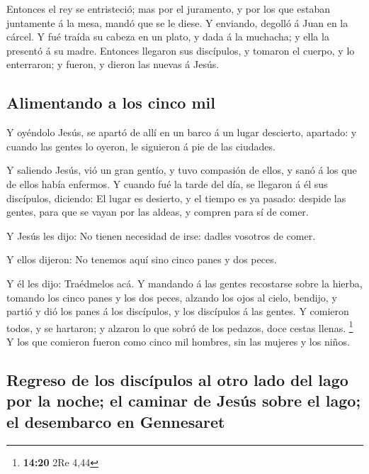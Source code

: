  Entonces el rey se entristeció; mas por el juramento, y
por los que estaban juntamente á la mesa, mandó que se le diese.
 Y enviando, degolló á Juan en la cárcel. 
Y fué traída su cabeza en un plato, y dada á la muchacha; y ella la
presentó á su madre.  Entonces llegaron sus discípulos, y
tomaron el cuerpo, y lo enterraron; y fueron, y dieron las nuevas á
Jesús.

\hypertarget{alimentando-a-los-cinco-mil}{%
\subsection{Alimentando a los cinco
mil}\label{alimentando-a-los-cinco-mil}}

 Y oyéndolo Jesús, se apartó de allí en un barco á un
lugar descierto, apartado: y cuando las gentes lo oyeron, le siguieron á
pie de las ciudades.

 Y saliendo Jesús, vió un gran gentío, y tuvo compasión
de ellos, y sanó á los que de ellos había enfermos.  Y
cuando fué la tarde del día, se llegaron á él sus discípulos, diciendo:
El lugar es desierto, y el tiempo es ya pasado: despide las gentes, para
que se vayan por las aldeas, y compren para sí de comer.

 Y Jesús les dijo: No tienen necesidad de irse: dadles
vosotros de comer.

 Y ellos dijeron: No tenemos aquí sino cinco panes y dos
peces.

 Y él les dijo: Traédmelos acá.  Y
mandando á las gentes recostarse sobre la hierba, tomando los cinco
panes y los dos peces, alzando los ojos al cielo, bendijo, y partió y
dió los panes á los discípulos, y los discípulos á las gentes.
 Y comieron todos, y se hartaron; y alzaron lo que sobró
de los pedazos, doce cestas llenas. \footnote{\textbf{14:20} 2Re 4,44}
 Y los que comieron fueron como cinco mil hombres, sin
las mujeres y los niños.

\hypertarget{regreso-de-los-discuxedpulos-al-otro-lado-del-lago-por-la-noche-el-caminar-de-jesuxfas-sobre-el-lago-el-desembarco-en-gennesaret}{%
\subsection{Regreso de los discípulos al otro lado del lago por la
noche; el caminar de Jesús sobre el lago; el desembarco en
Gennesaret}\label{regreso-de-los-discuxedpulos-al-otro-lado-del-lago-por-la-noche-el-caminar-de-jesuxfas-sobre-el-lago-el-desembarco-en-gennesaret}}


